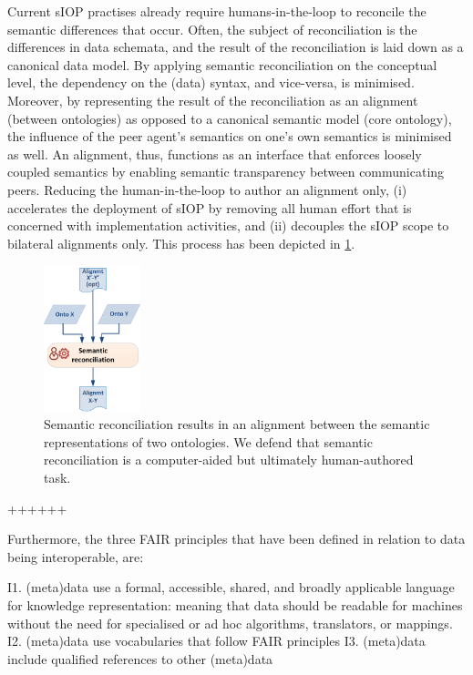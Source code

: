 \documentclass[sort&compress,preprint,authoryear,3p,twocolumn]{elsarticle}
\begin{document}
Current sIOP practises already require humans-in-the-loop to reconcile
the semantic differences that occur. Often, the subject of
reconciliation is the differences in data schemata, and the result of
the reconciliation is laid down as a canonical data model. By applying
semantic reconciliation on the conceptual level, the dependency on the
(data) syntax, and vice-versa, is minimised. Moreover, by representing
the result of the reconciliation as an alignment (between ontologies) as
opposed to a canonical semantic model (core ontology), the influence of
the peer agent's semantics on one's own semantics is minimised as well.
An alignment, thus, functions as an interface that enforces loosely
coupled semantics by enabling semantic transparency between
communicating peers. Reducing the human-in-the-loop to author an
alignment only, (i) accelerates the deployment of sIOP by removing all
human effort that is concerned with implementation activities, and (ii)
decouples the sIOP scope to bilateral alignments only. This process has
been depicted in \cref{fig:dt-reconciliation}.

\begin{figure}
\hypertarget{fig:dt-reconciliation}{%
\centering
\includegraphics[width=0.25\textwidth,height=\textheight]{src/images/DesignTimeReconciliation.png}
\caption{Semantic reconciliation results in an alignment between the
semantic representations of two ontologies. We defend that semantic
reconciliation is a computer-aided but ultimately human-authored
task.}\label{fig:dt-reconciliation}
}
\end{figure}

++++++

Furthermore, the three FAIR principles that have been defined in
relation to data being interoperable, are:

I1. (meta)data use a formal, accessible, shared, and broadly applicable
language for knowledge representation: meaning that data should be
readable for machines without the need for specialised or ad hoc
algorithms, translators, or mappings. I2. (meta)data use vocabularies
that follow FAIR principles I3. (meta)data include qualified references
to other (meta)data
\end{document}
